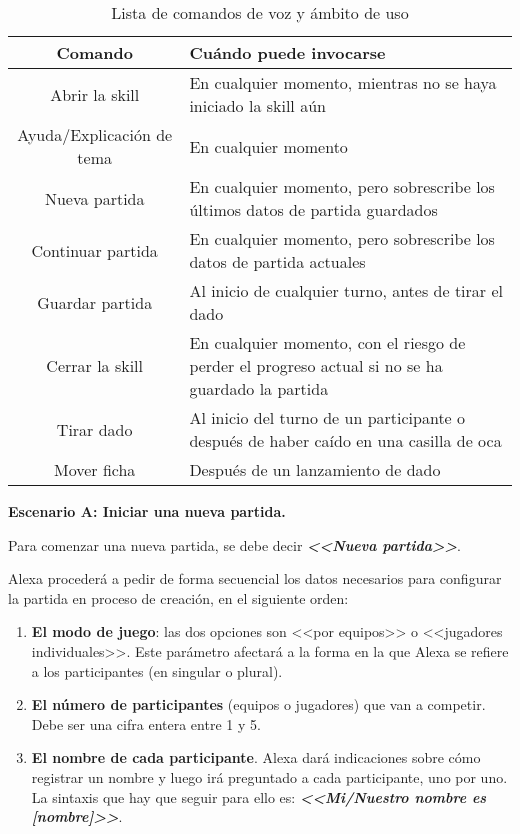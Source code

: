 \begin{table}[H]
	\centering
	\begin{tabular}{|c|p{8.5cm}|}
		\hline
		\rowcolor{lightgray}
		\textbf{Comando} & \textbf{Cuándo puede invocarse}\\
		\hline
		Abrir la skill & En cualquier momento, mientras no se haya iniciado la skill aún \\
		\hline
		Ayuda/Explicación de tema & En cualquier momento \\
		\hline
		Nueva partida & En cualquier momento, pero sobrescribe los últimos datos de partida guardados \\
		\hline
		Continuar partida & En cualquier momento, pero sobrescribe los datos de partida actuales \\
		\hline
		Guardar partida & Al inicio de cualquier turno, antes de tirar el dado \\
		\hline
		Cerrar la skill & En cualquier momento, con el riesgo de perder el progreso actual si no se ha guardado la partida \\
		\hline
		Tirar dado & Al inicio del turno de un participante o después de haber caído en una casilla de oca \\
		\hline
		Mover ficha & Después de un lanzamiento de dado \\
		\hline
	\end{tabular}
	\caption{Lista de comandos de voz y ámbito de uso}
	\label{tab:comandos-voz}
\end{table}

\textbf{Escenario A: Iniciar una nueva partida.}

Para comenzar una nueva partida, se debe decir \textbf{\textit{<<Nueva partida>>}}.

Alexa procederá a pedir de forma secuencial los datos necesarios para configurar la partida en proceso de creación, en el siguiente orden:
\begin{enumerate}
	\item \textbf{El modo de juego}: las dos opciones son <<por equipos>> o <<jugadores individuales>>. Este parámetro afectará a la forma en la que Alexa se refiere a los participantes (en singular o plural).
	\item \textbf{El número de participantes} (equipos o jugadores) que van a competir. Debe ser una cifra entera entre 1 y 5.
	\item \textbf{El nombre de cada participante}. Alexa dará indicaciones sobre cómo registrar un nombre y luego irá preguntado a cada participante, uno por uno. La sintaxis que hay que seguir para ello es: \textbf{\textit{<<Mi/Nuestro nombre es [nombre]>>}}.
\end{enumerate}

